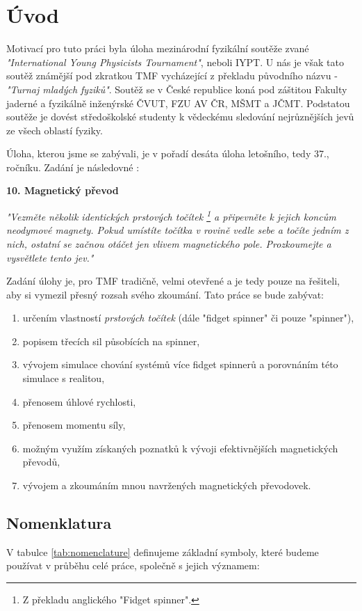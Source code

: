 
\chapter{Úvod}
\label{chap:introduction}
Motivací pro tuto práci byla úloha mezinárodní fyzikální soutěže zvané \textit{"International Young Physicists Tournament"}, neboli IYPT.
U nás je však tato soutěž známější pod zkratkou TMF vycházející z překladu původního názvu - \textit{"Turnaj mladých fyziků"}.
Soutěž se v České republice koná pod záštitou Fakulty jaderné a fyzikálně inženýrské ČVUT, FZU AV ČR, MŠMT a JČMT. Podstatou soutěže je dovést středoškolské studenty k vědeckému sledování nejrůznějších jevů ze všech oblastí fyziky.

Úloha, kterou jsme se zabývali, je v pořadí desáta úloha letošního, tedy 37., ročníku. Zadání je následovné \cite{tmf_tasks}:

\textbf{10. Magnetický převod}

\textit{"Vezměte několik identických prstových točítek \footnote{Z překladu anglického "Fidget spinner".} a připevněte k jejich koncům neodymové magnety. Pokud umístíte točítka v rovině vedle sebe a točíte jedním z nich, ostatní se začnou otáčet jen vlivem magnetického pole. Prozkoumejte a vysvětlete tento jev."}

Zadání úlohy je, pro TMF tradičně, velmi otevřené a je tedy pouze na řešiteli, aby si vymezil přesný rozsah svého zkoumání.
Tato práce se bude zabývat:

\begin{enumerate}[topsep=0pt, partopsep=0pt]
    \setlength{\itemsep}{0pt}%
    \setlength{\parskip}{0pt}%
    \item určením vlastností \textit{prstových točítek} (dále "fidget spinner" či pouze "spinner"),
    \item popisem třecích sil působících na spinner,
    \item vývojem simulace chování systémů více fidget spinnerů a porovnáním této simulace s realitou,
    \item přenosem úhlové rychlosti,
    \item přenosem momentu síly,
    \item možným využím získaných poznatků k vývoji efektivnějších magnetických převodů,
    \item vývojem a zkoumáním mnou navržených magnetických převodovek.
\end{enumerate}

\clearpage

\section[Nomenklatura]{Nomenklatura}
\label{sec:nomenclature}
V tabulce \ref{tab:nomenclature} definujeme základní symboly, které budeme používat v průběhu celé práce, společně s jejich významem:

